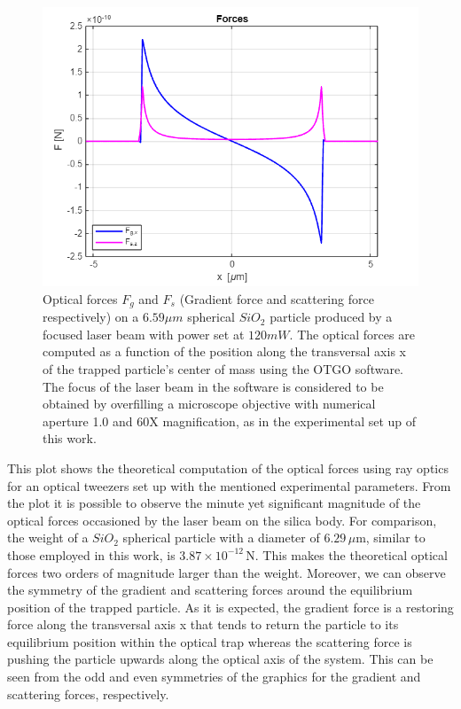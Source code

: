 \documentclass[letterpaper,12pt,oneside]{book}
\begin{document}
\begin{figure}[h]
    \centering
    \includegraphics[scale=0.5]{Screenshot 2025-03-05 004832.png}
    \caption{Optical forces $F_g$ and $F_s$ (Gradient force and scattering force respectively) on a $6.59 \mu m$ spherical $SiO_2$ particle produced by a focused laser beam with power set at $120 mW$. The optical forces are computed as a function of the position along the transversal axis x of the trapped particle's center of mass using the OTGO software. The focus of the laser beam in the software is considered to be obtained by overfilling a microscope objective with numerical aperture 1.0 and 60X magnification, as in the experimental set up of this work.}
    \label{OpticalforcessetupKaren}
\end{figure} 
This plot shows the theoretical computation of the optical forces using ray optics for an optical tweezers set up with the mentioned experimental parameters. From the plot it is possible to observe the minute yet significant magnitude of the optical forces occasioned by the laser beam on the silica body. For comparison, the weight of a $SiO_2$ spherical particle with a diameter of $6.29 \, \mu\text{m}$, similar to those employed in this work, is $3.87 \times 10^{-12} \, \text{N}$. This makes the theoretical optical forces two orders of magnitude larger than the weight.
Moreover, we can observe the symmetry of the gradient and scattering forces around the equilibrium position of the trapped particle. As it is expected, the gradient force is a restoring force along the transversal axis x that tends to return the particle to its equilibrium position within the optical trap whereas the scattering force is pushing the particle upwards along the optical axis of the system. This can be seen from the odd and even symmetries of the graphics for the gradient and scattering forces, respectively. 
\end{document}
